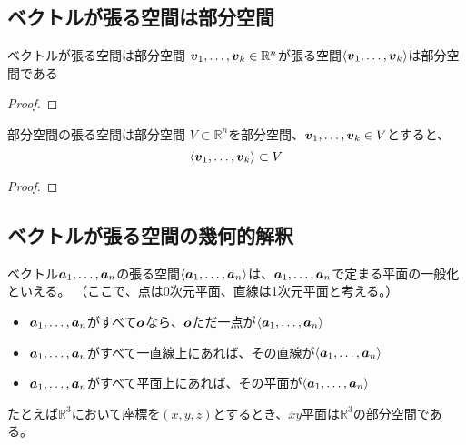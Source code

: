 \documentclass[../../../topic_linear-algebra]{subfiles}
\begin{document}
\subsection{ベクトルが張る空間は部分空間}

\begin{theorem}{ベクトルが張る空間は部分空間}
  $\vb*{v}_1,\dots, \vb*{v}_k \in \mathbb{R}^n$が張る空間$\langle \vb*{v}_1, \dots, \vb*{v}_k \rangle$は部分空間である
\end{theorem}

\begin{proof}
\end{proof}

\br

\begin{theorem}{部分空間の張る空間は部分空間}
  $V \subset \mathbb{R}^n$を部分空間、$\vb*{v}_1, \dots, \vb*{v}_k \in V$とすると、
  \begin{equation*}
    \langle \vb*{v}_1, \dots, \vb*{v}_k \rangle \subset V
  \end{equation*}
\end{theorem}

\begin{proof}
\end{proof}

\subsection{ベクトルが張る空間の幾何的解釈}

ベクトル$\vb*{a}_1, \ldots, \vb*{a}_n$の張る空間$\langle \vb*{a}_1, \ldots, \vb*{a}_n \rangle$は、$\vb*{a}_1, \ldots, \vb*{a}_n$で定まる平面の一般化といえる。
（ここで、点は0次元平面、直線は1次元平面と考える。）

\begin{itemize}
  \item $\vb*{a}_1, \ldots, \vb*{a}_n$がすべて$\vb*{o}$なら、$\vb*{o}$ただ一点が$\langle \vb*{a}_1, \ldots, \vb*{a}_n \rangle$
  \item $\vb*{a}_1, \ldots, \vb*{a}_n$がすべて一直線上にあれば、その直線が$\langle \vb*{a}_1, \ldots, \vb*{a}_n \rangle$
  \item $\vb*{a}_1, \ldots, \vb*{a}_n$がすべて平面上にあれば、その平面が$\langle \vb*{a}_1, \ldots, \vb*{a}_n \rangle$
\end{itemize}

\br

たとえば$\mathbb{R}^3$において座標を$(x, y, z)$とするとき、$xy$平面は$\mathbb{R}^3$の部分空間である。
\end{document}
